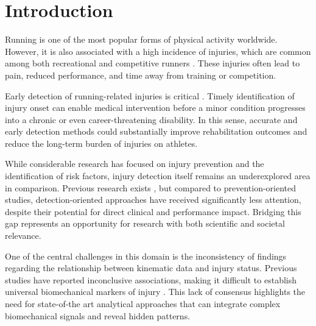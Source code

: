 \chapter{Introduction}\label{chap:introduction}




Running is one of the most popular forms of physical activity worldwide. However, it is also associated with a high incidence of injuries, which are common among both recreational and competitive runners \citep{vanGent2007}. These injuries often lead to pain, reduced performance, and time away from training or competition.

Early detection of running-related injuries is critical \citep{Mamom2023}. Timely identification of injury onset can enable medical intervention before a minor condition progresses into a chronic or even career-threatening disability. In this sense, accurate and early detection methods could substantially improve rehabilitation outcomes and reduce the long-term burden of injuries on athletes.  

While considerable research has focused on injury prevention and the identification of risk factors, injury detection itself remains an underexplored area in comparison. Previous research exists \citep{Mamom2023}, but compared to prevention-oriented studies, detection-oriented approaches have received significantly less attention, despite their potential for direct clinical and performance impact. Bridging this gap represents an opportunity for research with both scientific and societal relevance.  

One of the central challenges in this domain is the inconsistency of findings regarding the relationship between kinematic data and injury status. Previous studies have reported inconclusive associations, making it difficult to establish universal biomechanical markers of injury \citep{Peterson2022, Malisoux2024, Guan2022}. This lack of consensus highlights the need for state-of-the art analytical approaches that can integrate complex biomechanical signals and reveal hidden patterns.  

